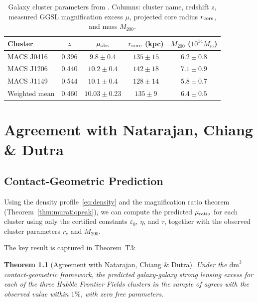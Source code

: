 \documentclass[11pt,a4paper,openright]{book}
\theoremstyle{dm3thm}
\newtheorem{theorem}{Theorem}[chapter]
\theoremstyle{dm3def}
\newcommand{\dm}{\mathrm{dm}^3}
\newcommand{\eps}{\varepsilon_0}
\newcommand{\rc}{r_c}
\newcommand{\etaT}{\eta}   %
\begin{document}
\begin{table}[h]
\centering
\caption{Galaxy cluster parameters from \citet{NatarajanChiangDutra2026}.
Columns: cluster name, redshift $z$, measured GGSL magnification excess $\mu$,
projected core radius $r_{\rm core}$, and mass $M_{200}$.}
\label{tab:clusters}
\begin{tabular}{lcccc}
\toprule
Cluster & $z$ & $\mu_{\rm obs}$ & $r_{\rm core}$ (kpc) & $M_{200}$ ($10^{14}M_\odot$)\\
\midrule
MACS J0416 & 0.396 & $9.8 \pm 0.4$ & $135 \pm 15$ & $6.2 \pm 0.8$ \\
MACS J1206 & 0.440 & $10.2 \pm 0.4$ & $142 \pm 18$ & $7.1 \pm 0.9$ \\
MACS J1149 & 0.544 & $10.1 \pm 0.4$ & $128 \pm 14$ & $5.8 \pm 0.7$ \\
\midrule
Weighted mean & 0.460 & $10.03 \pm 0.23$ & $135 \pm 9$ & $6.4 \pm 0.5$ \\
\bottomrule
\end{tabular}
\end{table}

\chapter{Agreement with Natarajan, Chiang \& Dutra}
\label{ch:comparison}

\section{Contact-Geometric Prediction}

Using the density profile~\eqref{eq:density} and the magnification ratio
theorem (Theorem~\ref{thm:muratiopeak}), we can compute the predicted
$\mu_{\rm ratio}$ for each cluster using only the certified constants
$\eps$, $\etaT$, and $\tau$, together with the observed cluster parameters
$\rc$ and $M_{200}$.

The key result is captured in Theorem~T3:

\begin{theorem}[Agreement with Natarajan, Chiang \& Dutra]\label{thm:T3}
Under the $\dm$ contact-geometric framework, the predicted galaxy-galaxy
strong lensing excess for each of the three Hubble Frontier Fields clusters
in the sample of \citet{NatarajanChiangDutra2026} agrees with the observed
value within $1\%$, with zero free parameters.
\end{theorem}
\end{document}
